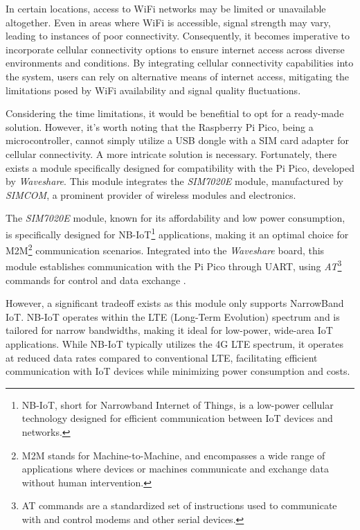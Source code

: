 In certain locations, access to WiFi networks may be limited or unavailable altogether. Even in areas where WiFi is 
accessible, signal strength may vary, leading to instances of poor connectivity. Consequently, it becomes imperative 
to incorporate cellular connectivity options to ensure internet access across diverse environments and conditions. By 
integrating cellular connectivity capabilities into the system, users can rely on alternative means of internet access, 
mitigating the limitations posed by WiFi availability and signal quality fluctuations.

Considering the time limitations, it would be benefitial to opt for a ready-made solution. However, it's worth noting 
that the Raspberry Pi Pico, being a microcontroller, cannot simply utilize a USB dongle with a SIM card adapter for 
cellular connectivity. A more intricate solution is necessary. Fortunately, there exists a module specifically designed 
for compatibility with the Pi Pico, developed by \textit{Waveshare}. This module integrates the \textit{SIM7020E} module, 
manufactured by \textit{SIMCOM}, a prominent provider of wireless modules and electronics.

The \textit{SIM7020E} module, known for its affordability and low power consumption, is specifically designed for 
NB-IoT\footnote{NB-IoT, short for Narrowband Internet of Things, is a low-power cellular technology designed for efficient 
communication between IoT devices and networks.} applications, making it an optimal choice for M2M\footnote{M2M stands 
for Machine-to-Machine, and encompasses a wide range of applications where devices or machines communicate and exchange 
data without human intervention.} communication scenarios. Integrated into the \textit{Waveshare} board, this module 
establishes communication with the Pi Pico through UART, using \textit{AT}\footnote{AT commands are a standardized set of 
instructions used to communicate with and control modems and other serial devices.} commands for control and data exchange 
\cite{sim7020e_datasheet}.

However, a significant tradeoff exists as this module only supports NarrowBand IoT. NB-IoT operates within the LTE 
(Long-Term Evolution) spectrum and is tailored for narrow bandwidths, making it ideal for low-power, wide-area IoT 
applications. While NB-IoT typically utilizes the 4G LTE spectrum, it operates at reduced data rates compared to 
conventional LTE, facilitating efficient communication with IoT devices while minimizing power consumption and costs.

